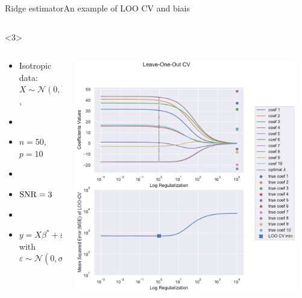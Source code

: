 \documentclass[10pt,aspectratio=43]{beamer}
\begin{document}
\begin{frame}{Ridge estimator}{An example of LOO CV and biais}
\begin{onlyenv}
\begin{columns}
\begin{column}{0.7\textwidth}
\begin{center}
                 \end{center}
            \end{column}
            \end{columns}
    \end{onlyenv}
    \begin{onlyenv}<3>
        \begin{columns}
            \begin{column}{0.4\textwidth}
                \begin{itemize}
                    \item Isotropic data: $X\sim\mathcal{N}(0,\mathrm{Id})$,
                    \item[]
                    \item $n=50$, $p=10$
                    \item[]
                    \item \textcolor{red}{$\operatorname{SNR}=3$}
                    \item[]
                    \item $y = X\beta^*+\varepsilon$ with $\varepsilon\sim \mathcal{N}(0, \sigma^2\mathrm{Id})$
                \end{itemize}
            \end{column}
            \begin{column}{0.7\textwidth}
                \begin{center}
                        \includegraphics[width=0.95\textwidth]{path_ridge_complete_3_.pdf}

\end{center}
\end{column}
\end{columns}
\end{onlyenv}
\end{frame}
\end{document}
